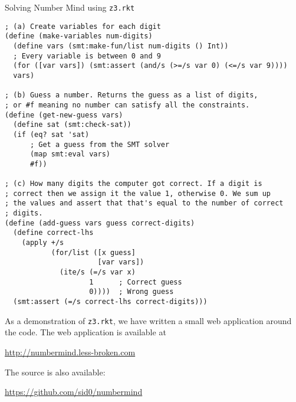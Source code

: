 \begin{program}
\caption{Solving Number Mind using \texttt{z3.rkt}}
\label{fig:numbermind}
\begin{verbatim}
; (a) Create variables for each digit
(define (make-variables num-digits)
  (define vars (smt:make-fun/list num-digits () Int))
  ; Every variable is between 0 and 9
  (for ([var vars]) (smt:assert (and/s (>=/s var 0) (<=/s var 9))))
  vars)

; (b) Guess a number. Returns the guess as a list of digits,
; or #f meaning no number can satisfy all the constraints.
(define (get-new-guess vars)
  (define sat (smt:check-sat))
  (if (eq? sat 'sat)
      ; Get a guess from the SMT solver
      (map smt:eval vars)
      #f))

; (c) How many digits the computer got correct. If a digit is
; correct then we assign it the value 1, otherwise 0. We sum up
; the values and assert that that's equal to the number of correct
; digits.
(define (add-guess vars guess correct-digits)
  (define correct-lhs
    (apply +/s
           (for/list ([x guess]
                      [var vars])
             (ite/s (=/s var x)
                    1      ; Correct guess
                    0))))  ; Wrong guess
  (smt:assert (=/s correct-lhs correct-digits)))
\end{verbatim}
\end{program}

As a demonstration of \texttt{z3.rkt}, we have written a small web application
around the code. The web application is available at

\begin{center}
\url{http://numbermind.less-broken.com}
\end{center}

The source is also available:

\begin{center}
\url{https://github.com/sid0/numbermind}
\end{center}
